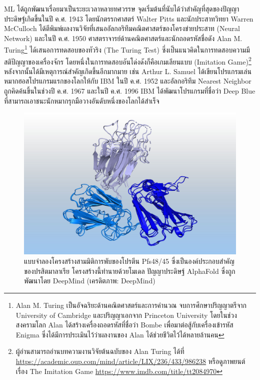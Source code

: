 ML ได้ถูกพัฒนาเรื่อยมาเป็นระยะเวลาหลายทศวรรษ จุดเริ่มต้นที่นับได้ว่าสำคัญที่สุดของปัญญาประดิษฐ์เกิดขึ้นในปี ค.ศ. 1943 โดยนักตรรกศาสตร์ Walter Pitts และนักประสาทวิทยา Warren McCulloch ได้ตีพิมพ์ผลงานวิจัยที่เสนออัลกอริทึมคณิตศาสตร์ของโครงข่ายประสาท (Neural Network) และในปี ค.ศ. 1950 ศาสตราจารย์ด้านคณิตศาสตร์และนักถอดรหัสชื่อดัง Alan M. Turing\footnote{Alan M. Turing เป็นอัจฉริยะด้านคณิตศาสตร์และการคำนวณ จบการศึกษาปริญญาตรีจาก University of Cambridge และปริญญาเอกจาก Princeton University โดยในช่วงสงครามโลก Alan ได้สร้างเครื่องถอดรหัสที่ชื่อว่า Bombe เพื่อมาต่อสู้กับเครื่องเข้ารหัส Enigma ซึ่งได้มีการประเมินไว้ว่าผลงานของ Alan ได้ช่วยชีวิตไว้ได้หลายล้านคน} ได้เสนอการทดสอบของทัวริง (The Turing Test)\autocite{turing1950} ซึ่งเป็นแนวคิดในการทดสอบความมีสติปัญญาของเครื่องจักร โดยหนึ่งในการทดสอบอันโด่งดังก็คือเกมเลียนแบบ (Imitation Game)\footnote{ผู้อ่านสามารถอ่านบทความงานวิจัยต้นฉบับของ Alan Turing ได้ที่ \url{https://academic.oup.com/mind/article/LIX/236/433/986238} หรือดูภาพยนต์เรื่อง The Imitation Game \url{https://www.imdb.com/title/tt2084970}} หลังจากนั้นได้มีเหตุการณ์สำคัญเกิดขึ้นอีกมากมาย เช่น Arthur L. Samuel ได้เขียนโปรแกรมเล่นหมากฮอสโปรแกรมแรกของโลกให้กับ IBM ในปี ค.ศ. 1952 และอัลกอริทึม Nearest Neighbor ถูกคิดค้นขึ้นในช่วงปี ค.ศ. 1967 และในปี ค.ศ. 1996 IBM ได้พัฒนาโปรแกรมที่ชื่อว่า Deep Blue ที่สามารถเอาชนะนักหมากรุกมือวางอันดับหนึ่งของโลกได้สำเร็จ

\begin{figure}[H]
    \centering
    \includegraphics[width=0.7\linewidth]{fig/malaria-parasite-protein-deepmind.jpeg}
    \caption{แบบจำลองโครงสร้างสามมิติการพับของโปรตีน Pfs48/45 ซึ่งเป็นองค์ประกอบสำคัญของปรสิตมาลาเรีย โครงสร้างนี้ทำนายด้วยโมเดล ปัญญาประดิษฐ์ AlphaFold ซึ่งถูกพัฒนาโดย DeepMind (เครดิตภาพ: DeepMind)}
    \label{fig:malaria_parasite}
\end{figure}

